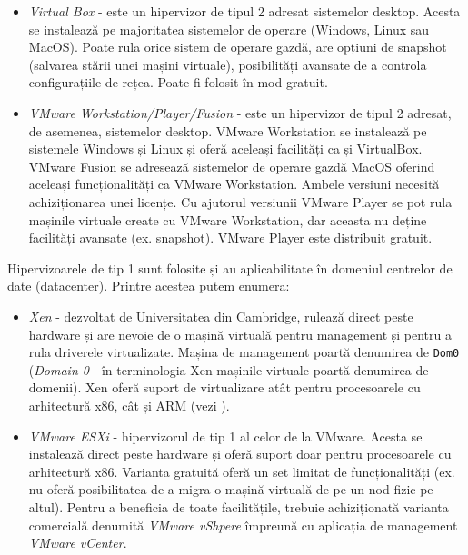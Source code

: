 \begin{itemize}
  \item \textit{Virtual Box} - este un hipervizor de tipul 2 adresat sistemelor desktop.
    Acesta se instalează pe majoritatea sistemelor de operare (Windows, Linux sau MacOS).
    Poate rula orice sistem de operare gazdă, are opțiuni de snapshot (salvarea stării unei mașini virtuale), posibilități avansate de a controla configurațiile de rețea.
    Poate fi folosit în mod gratuit.
  \item \textit{VMware Workstation/Player/Fusion} - este un hipervizor de tipul 2 adresat, de asemenea, sistemelor desktop.
    VMware Workstation se instalează pe sistemele Windows și Linux și oferă aceleași facilități ca și VirtualBox.
    VMware Fusion se adresează sistemelor de operare gazdă MacOS oferind aceleași funcționalități ca VMware Workstation.
    Ambele versiuni necesită achiziționarea unei licențe.
    Cu ajutorul versiunii VMware Player se pot rula mașinile virtuale create cu VMware Workstation, dar aceasta nu deține facilități avansate (ex. snapshot).
    VMware Player este distribuit gratuit.
\end{itemize}

Hipervizoarele de tip 1 sunt folosite și au aplicabilitate în domeniul centrelor de date (datacenter).
Printre acestea putem enumera:

\begin{itemize}
  \item \textit{Xen} - dezvoltat de Universitatea din Cambridge, rulează direct peste hardware și are nevoie de o mașină virtuală pentru management și pentru a rula driverele virtualizate.
    Mașina de management poartă denumirea de \texttt{Dom0} (\textit{Domain 0} - în terminologia Xen mașinile virtuale poartă denumirea de domenii).
    Xen oferă suport de virtualizare atât pentru procesoarele cu arhitectură x86, cât și ARM (vezi ).
  \item \textit{VMware ESXi} - hipervizorul de tip 1 al celor de la VMware.
    Acesta se instalează direct peste hardware și oferă suport doar pentru procesoarele cu arhitectură x86.
    Varianta gratuită oferă un set limitat de funcționalități (ex. nu oferă posibilitatea de a migra o mașină virtuală de pe un nod fizic pe altul).
    Pentru a beneficia de toate facilitățile, trebuie achiziționată varianta comercială denumită \textit{VMware vShpere} împreună cu aplicația de management \textit{VMware vCenter}.
\end{itemize}

